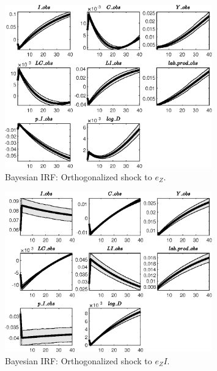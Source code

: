  
\begin{figure}[H]
\centering 
\includegraphics[width=0.80\textwidth]{BRS_comovement/Output/BRS_comovement_Bayesian_IRF_e_Z_1}
\caption{Bayesian IRF: Orthogonalized shock to ${e_Z}$.}
\label{Fig:BayesianIRF:e_Z:1}
\end{figure}
 
\begin{figure}[H]
\centering 
\includegraphics[width=0.80\textwidth]{BRS_comovement/Output/BRS_comovement_Bayesian_IRF_e_ZI_1}
\caption{Bayesian IRF: Orthogonalized shock to ${e_ZI}$.}
\label{Fig:BayesianIRF:e_ZI:1}
\end{figure}
 
